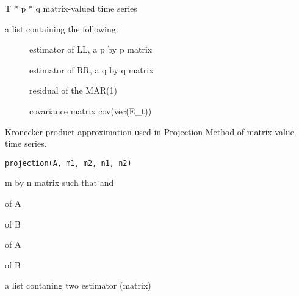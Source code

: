 \documentclass[a4paper]{book}
\begin{document}
%
\begin{Arguments}
\begin{ldescription}
\item[\code{xx}] T * p * q matrix-valued time series
\end{ldescription}
\end{Arguments}
%
\begin{Value}
a list containing the following:\begin{description}

\item[] estimator of LL, a p by p matrix
\item[] estimator of RR, a q by q matrix
\item[] residual of the MAR(1)
\item[] covariance matrix cov(vec(E\_t))

\end{description}

\end{Value}
%
\begin{Description}\relax
Kronecker product approximation used in Projection Method of matrix-value time series.
\end{Description}
%
\begin{Usage}
\begin{verbatim}
projection(A, m1, m2, n1, n2)
\end{verbatim}
\end{Usage}
%
\begin{Arguments}
\begin{ldescription}
\item[\code{A}] m by n matrix such that  and 

\item[\code{m1}]  of A

\item[\code{m2}]  of B

\item[\code{n1}]  of A

\item[\code{n2}]  of B
\end{ldescription}
\end{Arguments}
%
\begin{Value}
a list contaning two estimator (matrix)
\end{Value}
%
\begin{SeeAlso}\relax
{}
\end{SeeAlso}
\end{document}
